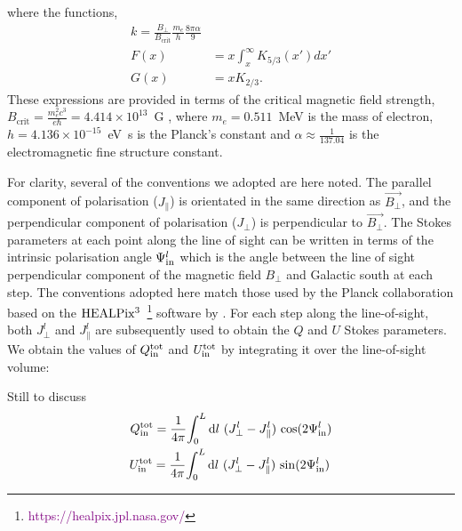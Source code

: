 \documentclass[usenatbib]{mnras}
\newcommand{\Andrew}[1]{\textcolor{dg}{#1}}
\newcommand{\Vasu}[1]{{\color{purple}#1}}
\begin{document}
where the functions,
\begin{align}
k = \frac{B_{\perp}}{B_{\mathrm{crit}}}\frac{m_{e}}{h} \frac{8\pi \alpha}{9}
\\
F(x) &= x \int_x^\infty K_{5/3}(x') dx'\\
G(x) &= x K_{2/3}.
\end{align}
These expressions are provided in terms of the critical magnetic field strength, $B_{\mathrm{crit}} = \frac{m_e^2c^3}{e\hbar} = 4.414 \times 10^{13}$~G , where $m_e = 0.511$~MeV is the mass of electron, $h = 4.136 \times 10^{-15}$~eV~s is the Planck's constant and $\alpha \approx \frac{1}{137.04}$ is the electromagnetic fine structure constant.


For clarity, several of the conventions we adopted are here noted. The parallel component of polarisation (${J_{\parallel}}$) is orientated in the same direction as  $\vec{B_{\perp}}$, and the perpendicular component of polarisation (${J_{\perp}}$) is perpendicular to $\vec{B_{\perp}}$. The Stokes parameters at each point along the line of sight can be written in terms of the intrinsic polarisation angle $\Psi^l_{\rm in}$ which is the angle between the line of sight perpendicular component of the magnetic field $B_{\perp}$ and Galactic south at each step. The conventions adopted here match those used by the Planck collaboration \cite{Planck_XIX} based on the $\rm HEALPix^3$~\footnote{\textcolor{purple}{https://healpix.jpl.nasa.gov/}} software by \cite{Healpix_2005}. For each step along the line-of-sight, both  ${J_{\perp}^l}$ and ${J_{\parallel}^l}$ are subsequently used to obtain the $Q$ and $U$ Stokes parameters. We obtain the values of $Q^{\rm tot}_{\rm in}$ and $U^{\rm tot}_{\rm in}$ by integrating it over the line-of-sight volume:

\Vasu{Still to discuss}
\begin{eqnarray}
Q_{\rm in}^{\rm tot} = \frac{1}{4\pi} {\int_0^L \mathrm{d}l \ ({J_{\perp}^l} - J_{\parallel}^l) \ {\cos}(2\Psi^l_{\rm in}) } \\
U_{\rm in}^{\rm tot} =\frac{1}{4\pi} {\int_0^L \mathrm{d}l \ ({J_{\perp}^l} - J_{\parallel}^l) \ {\sin}(2\Psi^l_{\rm in})} \,
\end{eqnarray}
\end{document}
